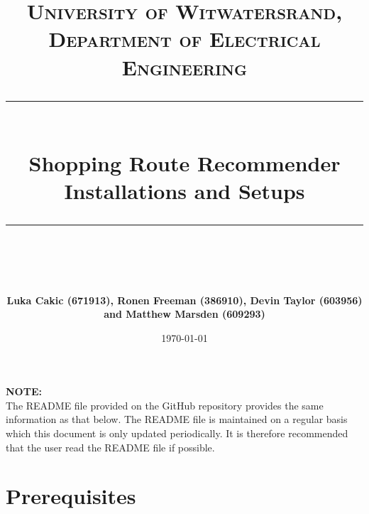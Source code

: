 \documentclass[10pt, a4paper, onecolumn]{scrartcl}
\begin{document}
	
	\newcommand{\horrule}[1]{\rule{\linewidth}{#1}}
	
	\title{\normalfont \normalsize
		\textsc{University of Witwatersrand, Department of Electrical Engineering} \\ [10pt]
		\horrule{0.5pt} \\ [10pt]
		\huge Shopping Route Recommender Installations and Setups \\
		\horrule{2pt} \\ [10pt]}
	\author{\textbf{\normalsize{Luka Cakic (671913), Ronen Freeman (386910), Devin Taylor (603956) and Matthew Marsden (609293)}} \\ [10pt]}
	\date {\normalsize \today}
	
	\maketitle
	
	
%		

	\textbf{NOTE:} \\
	
	The README file provided on the GitHub repository provides the same information as that below. The README file is maintained on a regular basis which this document is only updated periodically. It is therefore recommended that the user read the README file if possible.\\
	
	\section{Prerequisites}
	
\end{document}
